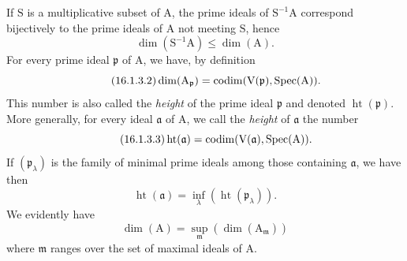 \begin{env}[16.1.3]
\label{0.16.1.3}
If $\mathrm{S}$ is a multiplicative subset of $\mathrm{A}$, the prime ideals of $\mathrm{S}^{-1}\mathrm{A}$ correspond bijectively to the prime ideals of $\mathrm{A}$ not meeting $\mathrm{S}$, hence
\begin{equation}
\label{0.16.1.3.1}
\tag{16.1.3.1}
  \dim(\mathrm{S}^{-1}\mathrm{A})\leq\dim(\mathrm{A}).
\end{equation}
For every prime ideal $\mathfrak{p}$ of $\mathrm{A}$, we have, by definition 
\begin{equation}
\label{0.16.1.3.2}
\tag{16.1.3.2}
  \dim(\mathrm{A}_\mathfrak{p})=\operatorname{codim}(\mathrm{V}(\mathfrak{p}),\operatorname{Spec}(\mathrm{A})).
\end{equation}
This number is also called the \emph{height} of the prime ideal $\mathfrak{p}$ and denoted $\operatorname{ht}(\mathfrak{p})$.
More generally, for every ideal $\mathfrak{a}$ of $\mathrm{A}$, we call the \emph{height} of $\mathfrak{a}$ the number
\begin{equation}
\label{0.16.1.3.3}
\tag{16.1.3.3}
  \operatorname{ht}(\mathfrak{a})=\operatorname{codim}(\mathrm{V}(\mathfrak{a}),\operatorname{Spec}(\mathrm{A})).
\end{equation}
If $(\mathfrak{p}_\lambda)$ is the family of minimal prime ideals among those containing $\mathfrak{a}$, we have then 
\begin{equation}
\label{0.16.1.3.4}
\tag{16.1.3.4}
  \operatorname{ht}(\mathfrak{a})=\inf_\lambda(\operatorname{ht}(\mathfrak{p}_\lambda)).
\end{equation}
We evidently have
\begin{equation}
\label{0.16.1.3.5}
\tag{16.1.3.5}
  \dim(\mathrm{A})=\sup_\mathfrak{m}(\dim(\mathrm{A}_\mathfrak{m}))
\end{equation}
where $\mathfrak{m}$ ranges over the set of maximal ideals of $\mathrm{A}$.
\end{env}


